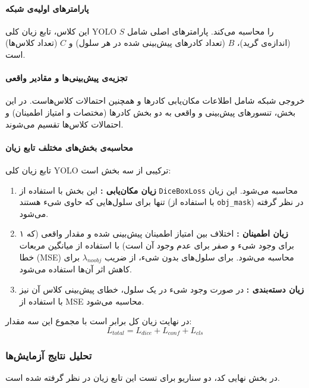 \documentclass{article}
\begin{document}
\paragraph{پارامترهای اولیه‌ی شبکه}
این کلاس، تابع زیان کلی YOLO را محاسبه می‌کند. پارامترهای اصلی شامل $S$ (اندازه‌ی گرید)، $B$ (تعداد کادرهای پیش‌بینی شده در هر سلول) و $C$ (تعداد کلاس‌ها) است. 

\paragraph{تجزیه‌ی پیش‌بینی‌ها و مقادیر واقعی}
خروجی شبکه شامل اطلاعات مکان‌یابی کادرها و همچنین احتمالات کلاس‌هاست. در این بخش، تنسورهای پیش‌بینی و واقعی به دو بخش کادرها (مختصات و امتیاز اطمینان) و احتمالات کلاس‌ها تقسیم می‌شوند.

\paragraph{محاسبه‌ی بخش‌های مختلف تابع زیان}
تابع زیان کلی YOLO ترکیبی از سه بخش است:
\begin{enumerate}
	\item \textbf{زیان مکان‌یابی :} این بخش با استفاده از \texttt{DiceBoxLoss} محاسبه می‌شود. این زیان تنها برای سلول‌هایی که حاوی شیء هستند (با استفاده از \texttt{obj\_mask}) در نظر گرفته می‌شود.
	\item \textbf{زیان اطمینان :} اختلاف بین امتیاز اطمینان پیش‌بینی شده و مقدار واقعی (که ۱ برای وجود شیء و صفر برای عدم وجود آن است) با استفاده از میانگین مربعات خطا (MSE) محاسبه می‌شود. برای سلول‌های بدون شیء، از ضریب $\lambda_{noobj}$ برای کاهش اثر آن‌ها استفاده می‌شود.
	\item \textbf{زیان دسته‌بندی :} در صورت وجود شیء در یک سلول، خطای پیش‌بینی کلاس آن نیز با استفاده از MSE محاسبه می‌شود.
\end{enumerate}
در نهایت زیان کل برابر است با مجموع این سه مقدار:
$$ L_{total} = L_{dice} + L_{conf} + L_{cls} $$

\subsubsection{تحلیل نتایج آزمایش‌ها}
در بخش نهایی کد، دو سناریو برای تست این تابع زیان در نظر گرفته شده است.
\end{document}
